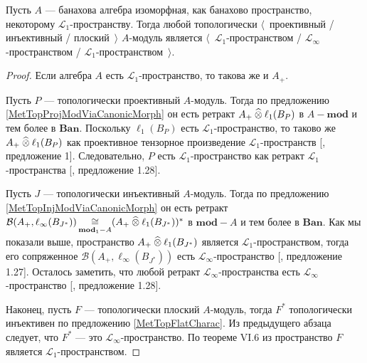 \begin{proposition}\label{TopProjInjFlatModOverMthscrL1SpCharac} Пусть $A$ --- банахова алгебра изоморфная, как банахово пространство, некоторому $\mathscr{L}_1$-пространству. Тогда любой топологически $\langle$~проективный / инъективный / плоский~$\rangle$ $A$-модуль является $\langle$~$\mathscr{L}_1$-пространством / $\mathscr{L}_\infty$-пространством / $\mathscr{L}_1$-пространством~$\rangle$.
\end{proposition}
\begin{proof} Если алгебра $A$ есть $\mathscr{L}_1$-пространство, то такова же и $A_+$. 

Пусть $P$ --- топологически проективный $A$-модуль. Тогда по предложению \ref{MetTopProjModViaCanonicMorph} он есть ретракт $A_+\mathbin{\widehat{\otimes}} \ell_1(B_P)$ в $A-\mathbf{mod}$ и тем более в $\mathbf{Ban}$. Поскольку $\ell_1(B_P)$ есть $\mathscr{L}_1$-пространство, то таково же $A_+\mathbin{\widehat{\otimes}}\ell_1(B_P)$ как проективное тензорное произведение $\mathscr{L}_1$-пространств [\cite{GonzDPPInTensProd}, предложение 1]. Следовательно, $P$ есть $\mathscr{L}_1$-пространство как ретракт $\mathscr{L}_1$-пространства [\cite{BourgNewClOfLpSp}, предложение 1.28].

Пусть $J$ --- топологически инъективный $A$-модуль. Тогда по предложению \ref{MetTopInjModViaCanonicMorph} он есть ретракт $\mathcal{B}(A_+,\ell_\infty(B_{J^*}))\mathop{\mathbin{\cong}}\limits_{\mathbf{mod}_1-A}(A_+\mathbin{\widehat{\otimes}}\ell_1(B_{J^*}))^*$ в $\mathbf{mod}-A$ и тем более в $\mathbf{Ban}$. Как мы показали выше, пространство $A_+\mathbin{\widehat{\otimes}}\ell_1(B_{J^*})$ является $\mathscr{L}_1$-пространством, тогда его сопряженное $\mathcal{B}(A_+,\ell_\infty(B_{J^*}))$ есть $\mathscr{L}_\infty$-пространство [\cite{BourgNewClOfLpSp}, предложение 1.27]. Осталось заметить, что любой ретракт $\mathscr{L}_\infty$-пространства есть $\mathscr{L}_\infty$-пространство [\cite{BourgNewClOfLpSp}, предложение 1.28].

Наконец, пусть $F$ --- топологически плоский $A$-модуль, тогда $F^*$ топологически инъективен по предложению \ref{MetTopFlatCharac}. Из предыдущего абзаца следует, что $F^*$ --- это $\mathscr{L}_\infty$-пространство. По теореме VI.6 из \cite{StegRethNucOpL1LInfSp} пространство $F$ является $\mathscr{L}_1$-пространством.
\end{proof}

